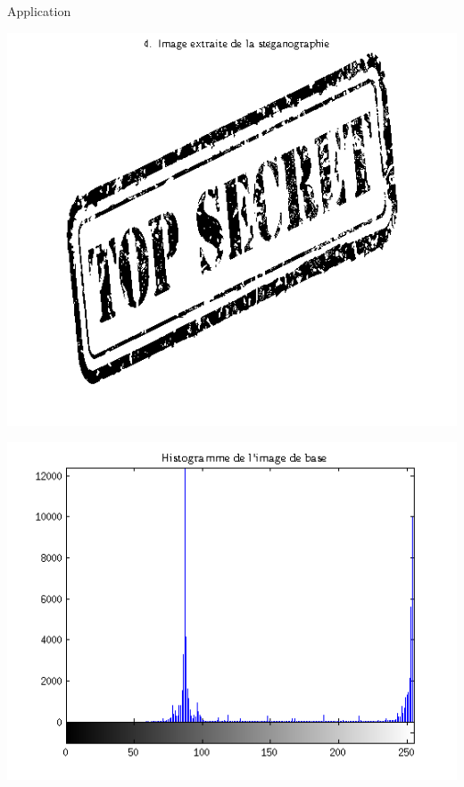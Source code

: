 \documentclass{beamer}
\begin{document}
\begin{frame}
\begin{exampleblock}{Application}
	\begin{minipage}{.33\textwidth}\centering
		\includegraphics[scale=0.18]{images/fig4.png}
		{\centering{}}
		\label{fig4}
	\end{minipage}
	\begin{minipage}{.32\textwidth}\centering
		\includegraphics[scale=0.18]{images/fig5.png}
		{\centering{}}
		\label{fig5}
	\end{minipage}
	\begin{minipage}{.32\textwidth}\centering

\end{minipage}
\end{exampleblock}
\end{frame}
\end{document}
